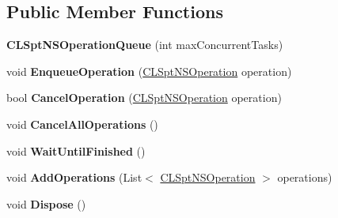 \subsection*{Public Member Functions}
\begin{DoxyCompactItemize}
\item 
\hypertarget{class_cloud_api_public_1_1_support_1_1_c_l_spt_n_s_operation_queue_a0383fbd58a8d23c517f29c60b8fa2084}{{\bfseries C\-L\-Spt\-N\-S\-Operation\-Queue} (int max\-Concurrent\-Tasks)}\label{class_cloud_api_public_1_1_support_1_1_c_l_spt_n_s_operation_queue_a0383fbd58a8d23c517f29c60b8fa2084}

\item 
\hypertarget{class_cloud_api_public_1_1_support_1_1_c_l_spt_n_s_operation_queue_ab562d8ffa239d09d5408cfb6c7812482}{void {\bfseries Enqueue\-Operation} (\hyperlink{class_cloud_api_public_1_1_support_1_1_c_l_spt_n_s_operation}{C\-L\-Spt\-N\-S\-Operation} operation)}\label{class_cloud_api_public_1_1_support_1_1_c_l_spt_n_s_operation_queue_ab562d8ffa239d09d5408cfb6c7812482}

\item 
\hypertarget{class_cloud_api_public_1_1_support_1_1_c_l_spt_n_s_operation_queue_ac28dd31bb0b351e212fc977f05a3ceb7}{bool {\bfseries Cancel\-Operation} (\hyperlink{class_cloud_api_public_1_1_support_1_1_c_l_spt_n_s_operation}{C\-L\-Spt\-N\-S\-Operation} operation)}\label{class_cloud_api_public_1_1_support_1_1_c_l_spt_n_s_operation_queue_ac28dd31bb0b351e212fc977f05a3ceb7}

\item 
\hypertarget{class_cloud_api_public_1_1_support_1_1_c_l_spt_n_s_operation_queue_aa79fbbf0a627051eb667b62509e31392}{void {\bfseries Cancel\-All\-Operations} ()}\label{class_cloud_api_public_1_1_support_1_1_c_l_spt_n_s_operation_queue_aa79fbbf0a627051eb667b62509e31392}

\item 
\hypertarget{class_cloud_api_public_1_1_support_1_1_c_l_spt_n_s_operation_queue_a4f0e8aa082f7a630fa2d33f6476e15c7}{void {\bfseries Wait\-Until\-Finished} ()}\label{class_cloud_api_public_1_1_support_1_1_c_l_spt_n_s_operation_queue_a4f0e8aa082f7a630fa2d33f6476e15c7}

\item 
\hypertarget{class_cloud_api_public_1_1_support_1_1_c_l_spt_n_s_operation_queue_a4fdba57edeb7746244d67ebc2e8157a5}{void {\bfseries Add\-Operations} (List$<$ \hyperlink{class_cloud_api_public_1_1_support_1_1_c_l_spt_n_s_operation}{C\-L\-Spt\-N\-S\-Operation} $>$ operations)}\label{class_cloud_api_public_1_1_support_1_1_c_l_spt_n_s_operation_queue_a4fdba57edeb7746244d67ebc2e8157a5}

\item 
\hypertarget{class_cloud_api_public_1_1_support_1_1_c_l_spt_n_s_operation_queue_a1b5beeb5e4cbddac103f5ac3d23f9a3d}{void {\bfseries Dispose} ()}\label{class_cloud_api_public_1_1_support_1_1_c_l_spt_n_s_operation_queue_a1b5beeb5e4cbddac103f5ac3d23f9a3d}

\end{DoxyCompactItemize}
